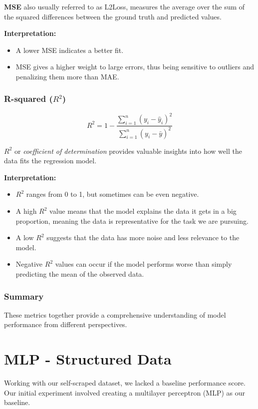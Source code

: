 \textbf{MSE} also usually referred to as L2Loss, measures the average over the sum of the squared differences between the ground truth and predicted values.

\textbf{Interpretation:}
\begin{itemize}
    \item A lower MSE indicates a better fit.
    \item MSE gives a higher weight to large errors, thus being sensitive to outliers and penalizing them more than MAE.
\end{itemize}

\subsubsection{R-squared (\(R^2\))}
\[ R^2 = 1 - \frac{\sum_{i=1}^{n} (y_i - \hat{y}_i)^2}{\sum_{i=1}^{n} (y_i - \bar{y})^2} \]

\textbf{\(R^2\)} or \textit{coefficient of determination} provides valuable insights into how well the data fits the regression model. 

\textbf{Interpretation:}
\begin{itemize}
    \item \( R^2 \) ranges from 0 to 1, but sometimes can be even negative.
    \item A high \(R^2\) value means that the model explains the data it gets in a big proportion, meaning the data is representative for the task we are pursuing.
    \item A low \(R^2\) suggests that the data has more noise and less relevance to the model.
    \item Negative \( R^2 \) values can occur if the model performs worse than simply predicting the mean of the observed data.
\end{itemize}

\subsubsection{Summary}

These metrics together provide a comprehensive understanding of model performance from different perspectives.

\section{MLP - Structured Data}
Working with our self-scraped dataset, we lacked a baseline performance score. Our initial experiment involved creating a multilayer perceptron (MLP) as our baseline.

